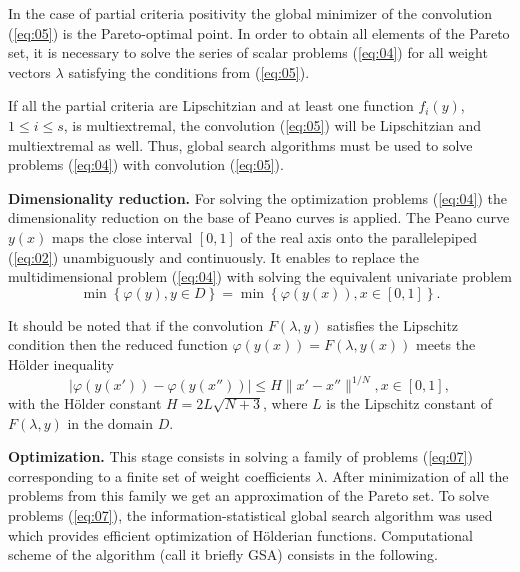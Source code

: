 \documentclass[runningheads]{llncs}
\begin{document}

In the case of partial criteria positivity the global minimizer of the convolution (\ref{eq:05}) is the Pareto-optimal point. In order to obtain all elements of the Pareto set, it is necessary to solve the series of scalar problems (\ref{eq:04}) for all weight vectors $\lambda$ satisfying the conditions from (\ref{eq:05}). 

If all the partial criteria are Lipschitzian and at least one function $f_i(y)$, $1 \leq i \leq s$, is multiextremal, the convolution (\ref{eq:05}) will be Lipschitzian and multiextremal as well. Thus, global search algorithms must be used to solve problems (\ref{eq:04}) with convolution (\ref{eq:05}).

\textbf{Dimensionality reduction.} For solving the optimization problems (\ref{eq:04}) the dimensionality reduction \cite{Gergel2019_2,Gergel2018,GergelKozinov2020} on the base of Peano curves is applied. The Peano curve $y(x)$ maps the close interval $[0,1]$ of the real axis onto the parallelepiped (\ref{eq:02}) unambiguously and continuously. It enables to replace the multidimensional problem (\ref{eq:04}) with solving the equivalent univariate problem
\begin{equation}
\label{eq:07}
\min \left\{\varphi(y), y \in D\right\} = \min\left\{ \varphi(y(x)), x \in [0,1] \right\}.
\end{equation}

It should be noted that if the convolution $F(\lambda,y)$ satisfies the Lipschitz condition then the reduced function $\varphi(y(x)) = F(\lambda,y(x))$ meets the H{\" o}lder inequality
\begin{equation}
\label{eq:08}
|\varphi(y(x')) - \varphi(y(x''))| \leq H \|x' - x''\|^{1/N} , x \in [0,1],
\end{equation}
with the H{\" o}lder constant $H=2L\sqrt{N+3}$, where $L$ is the Lipschitz constant of $F(\lambda,y)$ in the domain $D$.

\textbf{Optimization.} This stage consists in solving a family of problems (\ref{eq:07}) corresponding to a finite set of weight coefficients $\lambda$. After minimization of all the problems from this family we get an approximation of the Pareto set. To solve problems (\ref{eq:07}), the information-statistical global search algorithm \cite{ML_MCO_2023,Gergel2019_2,Gergel2018,GergelKozinov2020,Strongin2000,Sergeyev2013} was used which provides efficient optimization of H{\" o}lderian functions. Computational scheme of the algorithm (call it briefly GSA) consists in the following.
\end{document}
